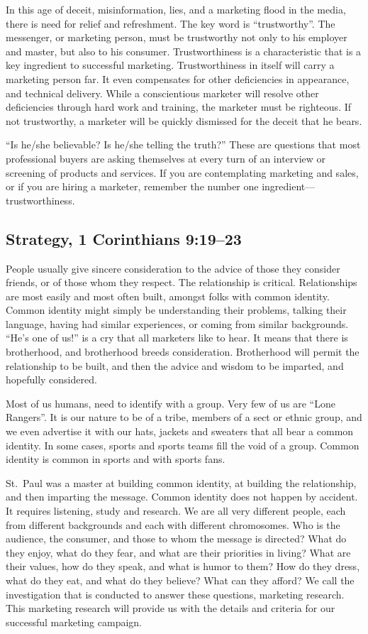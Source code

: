 \documentclass[12pt]{memoir}
\begin{document}
In this age of deceit, misinformation, lies, and a marketing flood
in the media, there is need for relief and refreshment. The key word
is ``trustworthy''. The messenger, or marketing person, must be
trustworthy not only to his employer and master, but also to his consumer.
Trustworthiness is a characteristic that is a key ingredient to successful
marketing. Trustworthiness in itself will carry a marketing person
far. It even compensates for other deficiencies in appearance, and
technical delivery. While a conscientious marketer will resolve other
deficiencies through hard work and training, the marketer must be
righteous. If not trustworthy, a marketer will be quickly dismissed
for the deceit that he bears.

``Is he\slash{}she believable? Is he\slash{}she telling the truth?'' These are
questions that most professional buyers are asking themselves at every
turn of an interview or screening of products and services. If you
are contemplating marketing and sales, or if you are hiring a marketer,
remember the number one ingredient---trustworthiness. 

\subsection{Strategy, 1 Corinthians 9:19--23}

People usually give sincere consideration to the advice of those they
consider friends, or of those whom they respect. The relationship
is critical. Relationships are most easily and most often built, amongst
folks with common identity. Common identity might simply be understanding
their problems, talking their language, having had similar experiences,
or coming from similar backgrounds. ``He's one of us!'' is a cry
that all marketers like to hear. It means that there is brotherhood,
and brotherhood breeds consideration. Brotherhood will permit the
relationship to be built, and then the advice and wisdom to be imparted,
and hopefully considered.

Most of us humans, need to identify with a group. Very few of us are
``Lone Rangers''. It is our nature to be of a tribe, members of
a sect or ethnic group, and we even advertise it with our hats, jackets
and sweaters that all bear a common identity. In some cases, sports
and sports teams fill the void of a group. Common identity is common
in sports and with sports fans.

St.~Paul was a master at building common identity, at building the
relationship, and then imparting the message. Common identity does
not happen by accident. It requires listening, study and research.
We are all very different people, each from different backgrounds
and each with different chromosomes. Who is the audience, the consumer,
and those to whom the message is directed? What do they enjoy, what
do they fear, and what are their priorities in living? What are their
values, how do they speak, and what is humor to them? How do they
dress, what do they eat, and what do they believe? What can they afford?
We call the investigation that is conducted to answer these questions,
marketing research. This marketing research will provide us with the
details and criteria for our successful marketing campaign. 
\end{document}
